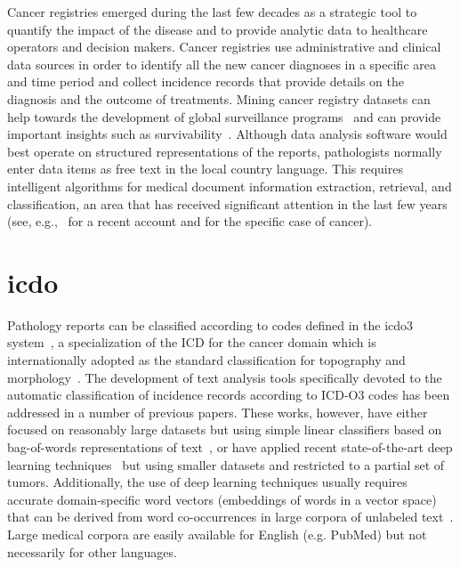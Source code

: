 Cancer registries emerged during the last few decades as a strategic
tool to quantify the impact of the disease and to provide analytic
data to healthcare operators and decision makers.  Cancer registries
use administrative and clinical data sources in order to identify all
the new cancer diagnoses in a specific area and time period and
collect incidence records that provide details on the diagnosis and
the outcome of treatments.  Mining cancer registry datasets can help
towards the development of global surveillance
programs~\cite{tourassi_deep_2017} and can provide important insights
such as survivability~\cite{delen_predicting_2005}.  Although data
analysis software would best operate on structured representations of
the reports, pathologists normally enter data items as free text in
the local country language. This requires intelligent algorithms for
medical document information extraction, retrieval, and
classification, an area that has received significant attention in the
last few years (see, e.g.,~\cite{mujtaba_clinical_2019} for a recent
account and \cite{yim_natural_2016} for the specific case of cancer).

\section{\ac{icdo}}
Pathology reports can be classified according
to codes defined in the \ac{icdo3}
system~\cite{fritz_international_2000}, a specialization of the ICD
for the cancer domain which is internationally adopted as the standard
classification for topography and
morphology~\cite{airtum_handbook_2008}.  The development of text
analysis tools specifically devoted to the automatic classification of
incidence records according to ICD-O3 codes has been addressed in a
number of previous papers. These
works, however, have either focused on reasonably large datasets but
using simple linear classifiers based on bag-of-words representations
of text~\cite{jouhet_automated_2011,kavuluru_automatic_2013}, or have
applied recent state-of-the-art deep learning
techniques~\cite{gao_hierarchical_2018,qiu_deep_2018} but using
smaller datasets and restricted to a partial set of
tumors. Additionally, the use of deep learning techniques usually
requires accurate domain-specific word vectors (embeddings of words in
a vector space) that can be derived from word co-occurrences in large
corpora of unlabeled
text~\cite{mikolov_linguistic_2013,pennington_glove:_2014,devlin2018bert}. Large
medical corpora are easily available for English (e.g. PubMed) but not
necessarily for other languages.

